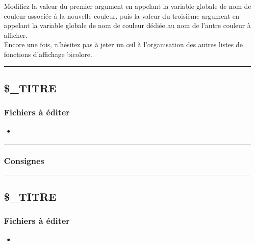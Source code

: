 \documentclass[a4paper,10pt]{article}
\begin{document}
Modifiez la valeur du premier argument en appelant la variable globale de nom de couleur associée à la nouvelle couleur, puis la valeur du troisième argument en appelant la variable globale de nom de couleur dédiée au nom de l'autre couleur à afficher.\\[1\baselineskip]

Encore une fois, n'hésitez pas à jeter un œil à l'organisation des autres listes de fonctions d'affichage bicolore.\\[1\baselineskip]



\color{green}\par\noindent\rule{\textwidth}{0.4pt}\color{white}

\color{green}
\subsection{\$\_TITRE}\color{white}

\color{blue}
\subsubsection{Fichiers à éditer}\color{white}
\begin{itemize}
    \item \textbf{\color{lime}}
\end{itemize}



\color{blue}\par\noindent\rule{\textwidth}{0.4pt}\color{white}

\color{blue}
\subsubsection{Consignes}\color{white}



\color{green}\par\noindent\rule{\textwidth}{0.4pt}\color{white}

\color{green}
\subsection{\$\_TITRE}\color{white}

\color{blue}
\subsubsection{Fichiers à éditer}\color{white}
\begin{itemize}
    \item \textbf{\color{lime}}
\end{itemize}
\end{document}

